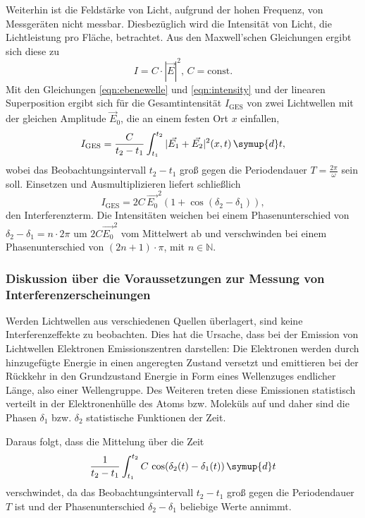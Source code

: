 Weiterhin ist die Feldstärke von Licht, aufgrund der hohen Frequenz, von
Messgeräten nicht messbar. Diesbezüglich wird die Intensität von Licht, die Lichtleistung pro
Fläche, betrachtet.
Aus den Maxwell'schen Gleichungen ergibt sich diese zu
\begin{equation}
	\label{eqn:intensity}
	I = C \cdot |\vec{E}|^2 \mathrm{, } \, C = \mathrm{const.}
\end{equation}
Mit den Gleichungen \eqref{eqn:ebenewelle} und \eqref{eqn:intensity} und der linearen
Superposition ergibt sich für die Gesamtintensität $I_{\mathrm{GES}}$ von zwei Lichtwellen mit
der gleichen Amplitude $\vec{E}_0$, die an einem festen Ort $x$ einfallen,
\begin{equation}
	I_{\mathrm{GES}} = \frac{C}{t_2 - t_1} \int_{t_1}^{t_2} |\vec{E_1} + \vec{E_2}|^2(x,t) \,  \symup{d}t \mathrm{,}
\end{equation}
wobei das Beobachtungsintervall $t_2 - t_1$ groß gegen die Periodendauer $T=\frac{2\pi}{\omega}$
sein soll.
Einsetzen und Ausmultiplizieren liefert schließlich
\begin{equation}
	I_{\mathrm{GES}} = 2C \, \vec{E_0}^2 (1+\cos(\delta_2 - \delta_1)) \mathrm{,}
\end{equation}
den Interferenzterm. Die Intensitäten weichen bei einem Phasenunterschied von
$\delta_2 - \delta_1 = n \cdot 2\pi$ um $2C \vec{E_0}^2$ vom Mittelwert ab und verschwinden
bei einem Phasenunterschied von $(2n+1) \cdot \pi$, mit $n \in \mathbb{N}$.


\subsubsection{Diskussion über die Voraussetzungen zur Messung von Interferenzerscheinungen}
\label{sec:messunginterferenz}

Werden Lichtwellen aus verschiedenen Quellen überlagert, sind keine Interferenzeffekte zu
beobachten. Dies hat die Ursache, dass bei der Emission von Lichtwellen Elektronen
Emissionszentren darstellen: Die Elektronen werden durch hinzugefügte Energie in einen
angeregten Zustand versetzt und emittieren bei der Rückkehr in den Grundzustand Energie in Form
eines Wellenzuges endlicher Länge, also einer Wellengruppe. Des Weiteren treten diese Emissionen
statistisch verteilt in der Elektronenhülle des Atoms bzw. Moleküls auf und daher sind die Phasen
$\delta_1$ bzw. $\delta_2$ statistische Funktionen der Zeit.

Daraus folgt, dass die Mittelung über die Zeit
\begin{equation}
	\frac{1}{t_2-t_1} \int_{t_1}^{t_2} C \, \cos(\delta_2(t)-\delta_1(t)) \, \symup{d}t
\end{equation}
verschwindet, da das Beobachtungsintervall $t_2-t_1$ groß gegen die Periodendauer $T$ ist und
der Phasenunterschied $\delta_2-\delta_1$ beliebige Werte annimmt.

